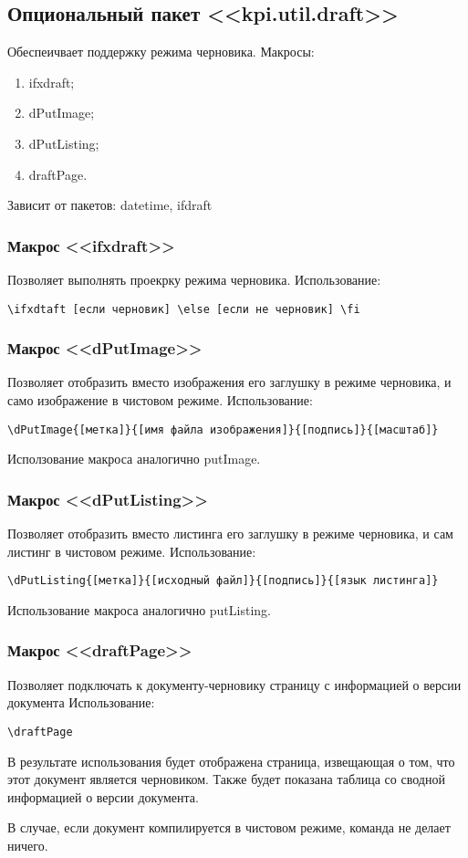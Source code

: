 \subsection{Опциональный пакет <<kpi.util.draft>>}
Обеспеичвает поддержку режима черновика.
Макросы:
\begin{enumerate}
\item ifxdraft;
\item dPutImage;
\item dPutListing;
\item draftPage.
\end{enumerate}
Зависит от пакетов: datetime, ifdraft 

\subsubsection{Макрос <<ifxdraft>>}
Позволяет выполнять проекрку режима черновика.
Использование:{\small
\begin{verbatim}
\ifxdtaft [если черновик] \else [если не черновик] \fi
\end{verbatim}}
\normalsize

\subsubsection{Макрос <<dPutImage>>}
Позволяет отобразить вместо изображения его заглушку в режиме черновика, и само изображение в чистовом режиме.
Использование:{\small
\begin{verbatim}
\dPutImage{[метка]}{[имя файла изображения]}{[подпись]}{[масштаб]}
\end{verbatim}}
\normalsize
Исползование макроса аналогично putImage.

\subsubsection{Макрос <<dPutListing>>}
Позволяет отобразить вместо листинга его заглушку в режиме черновика, и сам листинг в чистовом режиме.
Использование:{\small
\begin{verbatim}
\dPutListing{[метка]}{[исходный файл]}{[подпись]}{[язык листинга]}
\end{verbatim}}
\normalsize
Использование макроса аналогично putListing.

\subsubsection{Макрос <<draftPage>>}
Позволяет подключать к документу-черновику страницу с информацией о версии документа
Использование:{\small
\begin{verbatim}
\draftPage
\end{verbatim}}
\normalsize
В результате использования будет отображена страница, извещающая о том, что этот документ является черновиком. Также будет показана таблица со сводной информацией о версии документа.\par
В случае, если документ компилируется в чистовом режиме, команда не делает ничего.